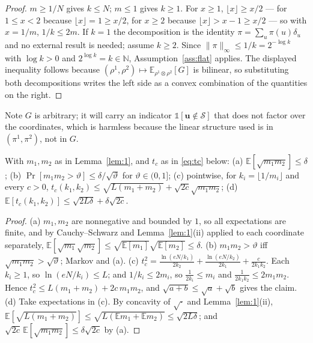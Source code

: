\documentclass{aicr-solution}
\newcommand{\Prob}[1]{\Pr\!\left[#1\right]}
\newcommand{\Exp}{\mathbb{E}}
\newcommand{\vu}{\mathbf{u}}
\newcommand{\ind}{\mathbb{1}}
\begin{document}
\begin{proof}
$m \ge 1/N$ gives $k \le N$; $m \le 1$ gives $k \ge 1$. For $x \ge 1$,
$\lfloor x \rfloor \ge x/2$ --- for $1 \le x < 2$ because
$\lfloor x \rfloor = 1 \ge x/2$, for $x \ge 2$ because
$\lfloor x \rfloor > x-1 \ge x/2$ --- so with $x = 1/m$, $1/k \le 2m$. If $k = 1$
the decomposition is the identity $\pi = \sum_u \pi(u)\delta_u$ and no external
result is needed; assume $k \ge 2$. Since
$\|\pi\|_\infty \le 1/k = 2^{-\log k}$ with $\log k > 0$ and
$2^{\log k} = k \in \mathbb{N}$, Assumption~\ref{ass:flat} applies. The displayed
inequality follows because
$(\rho^1,\rho^2) \mapsto \Exp_{\rho^1 \otimes \rho^2}[G]$ is bilinear, so
substituting both decompositions writes the left side as a convex combination of
the quantities on the right.
\end{proof}

Note $G$ is arbitrary; it will carry an indicator
$\ind[\vu \notin \mathcal{S}]$ that does not factor over the coordinates, which is
harmless because the linear structure used is in $(\pi^1,\pi^2)$, not in $G$.

\begin{lemma}\label{lem:A}
With $m_1,m_2$ as in Lemma~\ref{lem:1}, and $t_c$ as in \eqref{eq:tc} below:
(a) $\Exp[\sqrt{m_1m_2}] \le \delta$;
(b) $\Prob{m_1m_2 > \vartheta} \le \delta/\sqrt{\vartheta}$ for
$\vartheta \in (0,1]$;
(c) pointwise, for $k_i = \lfloor 1/m_i \rfloor$ and every $c > 0$,
$t_c(k_1,k_2) \le \sqrt{L(m_1+m_2)} + \sqrt{2c}\sqrt{m_1m_2}$;
(d) $\Exp[t_c(k_1,k_2)] \le \sqrt{2L\delta} + \delta\sqrt{2c}$.
\end{lemma}

\begin{proof}
(a) $m_1,m_2$ are nonnegative and bounded by $1$, so all expectations are finite,
and by Cauchy--Schwarz and Lemma~\ref{lem:1}(ii) applied to each coordinate
separately,
$\Exp[\sqrt{m_1}\sqrt{m_2}] \le \sqrt{\Exp[m_1]}\sqrt{\Exp[m_2]} \le \delta$.
(b) $m_1m_2 > \vartheta$ iff $\sqrt{m_1m_2} > \sqrt{\vartheta}$; Markov and (a).
(c) $t_c^{2} = \frac{\ln(eN/k_1)}{2k_2} + \frac{\ln(eN/k_2)}{2k_1}
+ \frac{c}{2k_1k_2}$. Each $k_i \ge 1$, so $\ln(eN/k_i) \le L$; and
$1/k_i \le 2m_i$, so $\frac{1}{2k_i} \le m_i$ and
$\frac{1}{2k_1k_2} \le 2m_1m_2$. Hence
$t_c^{2} \le L(m_1+m_2) + 2c\,m_1m_2$, and
$\sqrt{a+b} \le \sqrt{a} + \sqrt{b}$ gives the claim.
(d) Take expectations in (c). By concavity of $\sqrt{\cdot}$ and
Lemma~\ref{lem:1}(ii),
$\Exp[\sqrt{L(m_1+m_2)}] \le \sqrt{L(\Exp m_1 + \Exp m_2)} \le \sqrt{2L\delta}$;
and $\sqrt{2c}\,\Exp[\sqrt{m_1m_2}] \le \delta\sqrt{2c}$ by (a).
\end{proof}
\end{document}
